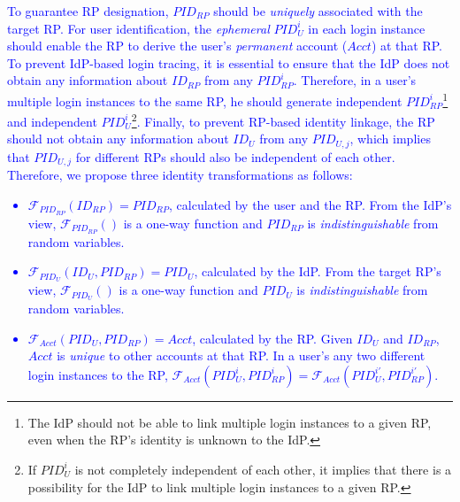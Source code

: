 \textcolor{blue}{To guarantee RP designation, $PID_{RP}$ should be \emph{uniquely} associated with the target RP.
For user identification, the \emph{ephemeral} $PID_{U}^i$ in each login instance should enable the RP to derive the user's \emph{permanent} account  ($Acct$) at that RP.
To prevent IdP-based login tracing, it is essential to ensure that the IdP does not obtain any information about $ID_{RP}$ from any $PID_{RP}^i$. Therefore, in a user's multiple login instances to the same RP, he should generate independent $PID_{RP}^i$\footnote{The IdP should not be able to link multiple login instances to a given RP, even when the RP's identity is unknown to the IdP.} %
and independent $PID_U^i$\footnote{If $PID_U^i$ is not completely independent of each other, it implies that there is a possibility for the IdP to link multiple login instances to a given RP.}.
Finally, to prevent RP-based identity linkage,
the RP should not obtain any information about $ID_U$ from any $PID_{U,j}$, which implies that $PID_{U,j}$ for different RPs should also be independent of each other.
Therefore, we propose three identity transformations as follows:
\vspace{-\topsep}\begin{itemize}
\setlength{\topsep}{0pt}
\setlength{\partopsep}{0pt}
\setlength{\itemsep}{0pt}
\setlength{\parsep}{0pt}
\setlength{\parskip}{0pt}
\item
$\mathcal{F}_{PID_{RP}}(ID_{RP}) = PID_{RP}$, calculated by the user and the RP.
From the IdP's view,
$\mathcal{F}_{PID_{RP}}()$ is a one-way function and $PID_{RP}$
is \emph{indistinguishable} from random variables.
\item
$\mathcal{F}_{PID_U}(ID_U, PID_{RP}) = PID_{U}$, calculated by the IdP.
From the target RP's view,
    $\mathcal{F}_{PID_U}()$ is a one-way function and $PID_{U}$ is \emph{indistinguishable} from random variables.
\item
$\mathcal{F}_{Acct}(PID_{U}, PID_{RP}) = Acct$, calculated by the RP.
Given $ID_U$ and $ID_{RP}$, $Acct$ is %
\emph{unique} to other accounts at that RP.
In a user's any two different login instances to the RP,
 $\mathcal{F}_{Acct}(PID_{U}^i, PID_{RP}^i) = \mathcal{F}_{Acct}(PID_{U}^{i'}, PID_{RP}^{i'})$.
\end{itemize}}

